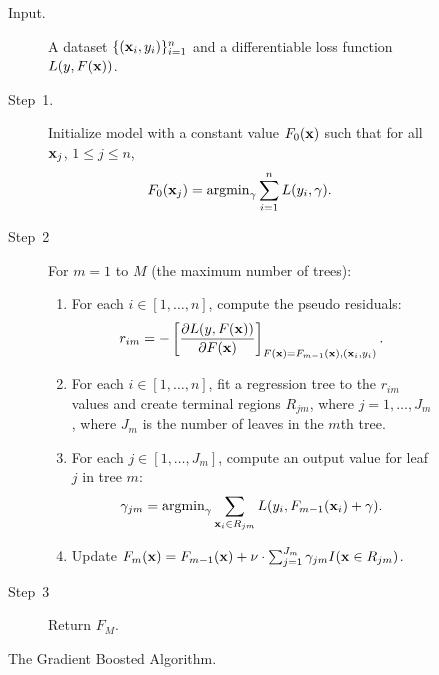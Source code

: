 \begin{figure}[th!]
{\small
\begin{description}
    \item[Input.] A dataset $\{(\mathbf{x}_i, y_i)\}_{i = 1}^{n}$ and a 
        differentiable loss function $L(y, F(\mathbf{x}))$.
    
    \item[Step~1.] Initialize model with a constant value $F_0(\mathbf{x})$ such
        that for all $\mathbf{x}_j$, $1 \leq j \leq n$,
        \begin{equation}
            F_0(\mathbf{x}_j) = \operatorname{argmin}_{\gamma} \sum_{i = 1}^{n} L(y_i, \gamma).
        \end{equation}   
    \item[Step~2] For $m = 1$ to $M$ (the maximum number of trees):
        \begin{enumerate}
            \item For each $i \in [1, \ldots, n]$, compute the pseudo residuals:
                \begin{equation} \label{eqn:pseudo_residuals}
                    r_{i m} = 
                            - \left [ 
                                \frac{\partial L(y, F(\mathbf{x}))}{\partial F(\mathbf{x})} 
                              \right ]_{F(\mathbf{x}) = F_{m - 1}(\mathbf{x}), (\mathbf{x}_i, y_i)}.
                \end{equation}
            \item For each $i \in [1, \ldots, n]$, fit a regression tree to the 
                $r_{i m}$ values and create terminal regions $R_{j m}$, where 
                $j = 1, \ldots, J_m$, where $J_m$ is the number of leaves in the 
                $m$th tree.
            \item For each $j \in [1, \ldots, J_m]$, compute an output value for 
                leaf $j$ in tree $m$:
                \begin{equation}
                    \label{eqn:leaf_values}
                    \gamma_{j m} = \operatorname{argmin}_{\gamma} 
                            \sum_{\mathbf{x}_i \in R_{j m}} L(y_i, F_{m - 1}(\mathbf{x}_i) + \gamma).
                \end{equation}
            \item Update $F_m(\mathbf{x}) = F_{m - 1}(\mathbf{x}) + 
                \nu \cdot \sum_{j = 1}^{J_m} \gamma_{j m} I(\mathbf{x} \in R_{j m})$.
        \end{enumerate}
    \item[Step~3] Return $F_M$.
\end{description}
}
 \caption{The Gradient Boosted Algorithm.}
\label{fig:gbm_algo}
\end{figure}


